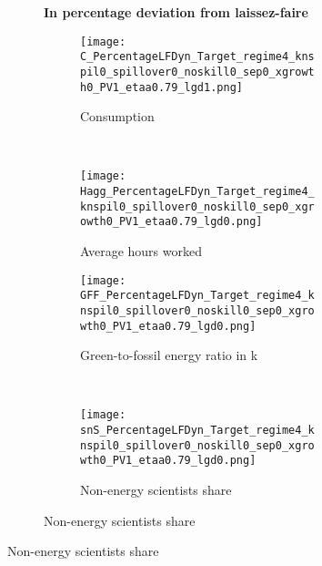 \begin{figure}[h!!!]
	\centering \caption{Efficient and optimal allocation relative to laissez-faire}
\label{fig:optAll_percLf_dyn}
	\begin{subfigure}[]{1\textwidth}	
		\centering\footnotesize{\textbf{In percentage deviation from laissez-faire}}\\ \vspace{2mm}
	\begin{subfigure}[]{0.4\textwidth}
		\caption{Consumption}
		\texttt{[image: C\_PercentageLFDyn\_Target\_regime4\_knspil0\_spillover0\_noskill0\_sep0\_xgrowth0\_PV1\_etaa0.79\_lgd1.png]}
	\end{subfigure}
\begin{minipage}[]{0.1\textwidth}
	\ 
\end{minipage}
	\begin{subfigure}[]{0.4\textwidth}
				\caption{Average hours worked }
		\texttt{[image: Hagg\_PercentageLFDyn\_Target\_regime4\_knspil0\_spillover0\_noskill0\_sep0\_xgrowth0\_PV1\_etaa0.79\_lgd0.png]}
	\end{subfigure}

\vspace{3mm}
\begin{subfigure}[]{0.4\textwidth}
				\caption{Green-to-fossil energy ratio in k}
	\texttt{[image: GFF\_PercentageLFDyn\_Target\_regime4\_knspil0\_spillover0\_noskill0\_sep0\_xgrowth0\_PV1\_etaa0.79\_lgd0.png]}
\end{subfigure}
\begin{minipage}[]{0.1\textwidth}
	\ 
\end{minipage}
\begin{subfigure}[]{0.4\textwidth}
			\caption{ Non-energy scientists share}
	\texttt{[image: snS\_PercentageLFDyn\_Target\_regime4\_knspil0\_spillover0\_noskill0\_sep0\_xgrowth0\_PV1\_etaa0.79\_lgd0.png]}
\end{subfigure}
\end{subfigure}


\end{figure}
